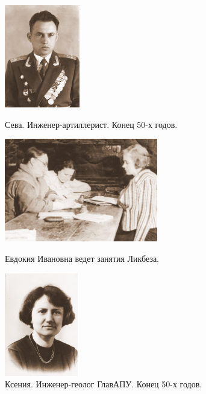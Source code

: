 \documentclass[utf8x, 12pt]{G7-32a} %
\begin{document}
\begin{figure}[h!]
    \begin{minipage}[h!]{50mm}
         \vspace{10pt}
         \begin{center}
         \vspace{-15pt}
         \includegraphics[height=45mm]{inc/Varzar/21.jpg} 
         \end{center}
         \vspace{-10pt}
         Сева. Инженер-артиллерист. Конец 50-х годов.
    \end{minipage}
    \hfill
   \begin{minipage}[h]{70mm}
       \begin{center}
       \includegraphics[height=45mm]{inc/Varzar/22.jpg} 
       \end{center}
       \caption{Евдокия Ивановна ведет занятия Ликбеза.}
   \end{minipage}
   \hfill
    \begin{minipage}[h!]{50mm}
        \begin{center}
        \includegraphics[height=45mm]{inc/Varzar/23.jpg}
        \end{center}
        \caption{Ксения. Инженер-геолог ГлавАПУ. Конец 50-х годов.}
    \end{minipage}
\end{figure}
\end{document}
